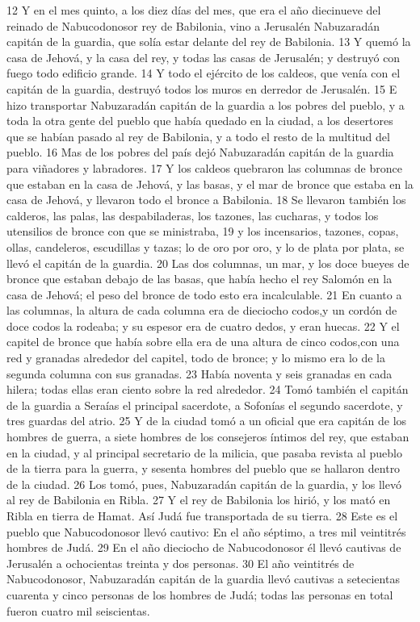 12 Y en el mes quinto, a los diez días del mes, que era el año diecinueve del reinado de Nabucodonosor rey de Babilonia, vino a Jerusalén Nabuzaradán capitán de la guardia, que solía estar delante del rey de Babilonia.
13 Y quemó la casa de Jehová, y la casa del rey, y todas las casas de Jerusalén; y destruyó con fuego todo edificio grande.
14 Y todo el ejército de los caldeos, que venía con el capitán de la guardia, destruyó todos los muros en derredor de Jerusalén.
15 E hizo transportar Nabuzaradán capitán de la guardia a los pobres del pueblo, y a toda la otra gente del pueblo que había quedado en la ciudad, a los desertores que se habían pasado al rey de Babilonia, y a todo el resto de la multitud del pueblo.
16 Mas de los pobres del país dejó Nabuzaradán capitán de la guardia para viñadores y labradores.
17 Y los caldeos quebraron las columnas de bronce que estaban en la casa de Jehová, y las basas, y el mar de bronce que estaba en la casa de Jehová, y llevaron todo el bronce a Babilonia.
18 Se llevaron también los calderos, las palas, las despabiladeras, los tazones, las cucharas, y todos los utensilios de bronce con que se ministraba,
19 y los incensarios, tazones, copas, ollas, candeleros, escudillas y tazas; lo de oro por oro, y lo de plata por plata, se llevó el capitán de la guardia.
20 Las dos columnas, un mar, y los doce bueyes de bronce que estaban debajo de las basas, que había hecho el rey Salomón en la casa de Jehová; el peso del bronce de todo esto era incalculable.
21 En cuanto a las columnas, la altura de cada columna era de dieciocho codos,y un cordón de doce codos la rodeaba; y su espesor era de cuatro dedos, y eran huecas.
22 Y el capitel de bronce que había sobre ella era de una altura de cinco codos,con una red y granadas alrededor del capitel, todo de bronce; y lo mismo era lo de la segunda columna con sus granadas.
23 Había noventa y seis granadas en cada hilera; todas ellas eran ciento sobre la red alrededor.
24 Tomó también el capitán de la guardia a Seraías el principal sacerdote, a Sofonías el segundo sacerdote, y tres guardas del atrio.
25 Y de la ciudad tomó a un oficial que era capitán de los hombres de guerra, a siete hombres de los consejeros íntimos del rey, que estaban en la ciudad, y al principal secretario de la milicia, que pasaba revista al pueblo de la tierra para la guerra, y sesenta hombres del pueblo que se hallaron dentro de la ciudad.
26 Los tomó, pues, Nabuzaradán capitán de la guardia, y los llevó al rey de Babilonia en Ribla.
27 Y el rey de Babilonia los hirió, y los mató en Ribla en tierra de Hamat. Así Judá fue transportada de su tierra.
28 Este es el pueblo que Nabucodonosor llevó cautivo: En el año séptimo, a tres mil veintitrés hombres de Judá.
29 En el año dieciocho de Nabucodonosor él llevó cautivas de Jerusalén a ochocientas treinta y dos personas.
30 El año veintitrés de Nabucodonosor, Nabuzaradán capitán de la guardia llevó cautivas a setecientas cuarenta y cinco personas de los hombres de Judá; todas las personas en total fueron cuatro mil seiscientas.

